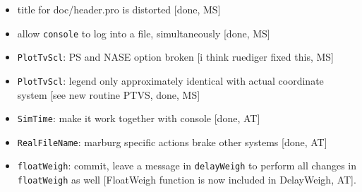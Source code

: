 \documentclass[12pt]{article}
\begin{document}
\begin{itemize}
\item title for doc/header.pro is distorted [done, MS] 
\item allow \texttt{console} to log into a file, simultaneously [done, MS]
\item \texttt{PlotTvScl}: PS and NASE option broken [i think ruediger fixed this, MS] 
\item \texttt{PlotTvScl}: legend only approximately identical with actual coordinate system [see new routine PTVS, done, MS]
\item \texttt{SimTime}: make it work together with console [done, AT] 
\item \texttt{RealFileName}: marburg specific actions brake other systems [done, AT]
\item \texttt{floatWeigh}: commit, leave a message in \texttt{delayWeigh} to perform all changes in \texttt{floatWeigh} as well [FloatWeigh function is now included in DelayWeigh, AT].
\end{itemize}
\end{document}
